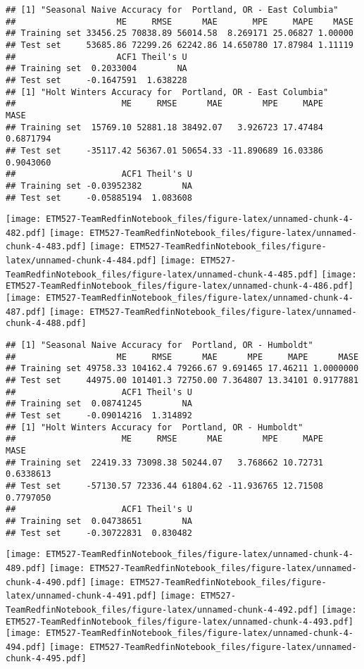 \documentclass[]{article}
\begin{document}
\begin{verbatim}
## [1] "Seasonal Naive Accuracy for  Portland, OR - East Columbia"
##                    ME     RMSE      MAE       MPE     MAPE    MASE
## Training set 33456.25 70838.89 56014.58  8.269171 25.06827 1.00000
## Test set     53685.86 72299.26 62242.86 14.650780 17.87984 1.11119
##                    ACF1 Theil's U
## Training set  0.2033004        NA
## Test set     -0.1647591  1.638228
## [1] "Holt Winters Accuracy for  Portland, OR - East Columbia"
##                     ME     RMSE      MAE        MPE     MAPE      MASE
## Training set  15769.10 52881.18 38492.07   3.926723 17.47484 0.6871794
## Test set     -35117.42 56367.01 50654.33 -11.890689 16.03386 0.9043060
##                     ACF1 Theil's U
## Training set -0.03952382        NA
## Test set     -0.05885194  1.083608
\end{verbatim}

\texttt{[image: ETM527-TeamRedfinNotebook\_files/figure-latex/unnamed-chunk-4-482.pdf]}
\texttt{[image: ETM527-TeamRedfinNotebook\_files/figure-latex/unnamed-chunk-4-483.pdf]}
\texttt{[image: ETM527-TeamRedfinNotebook\_files/figure-latex/unnamed-chunk-4-484.pdf]}
\texttt{[image: ETM527-TeamRedfinNotebook\_files/figure-latex/unnamed-chunk-4-485.pdf]}
\texttt{[image: ETM527-TeamRedfinNotebook\_files/figure-latex/unnamed-chunk-4-486.pdf]}
\texttt{[image: ETM527-TeamRedfinNotebook\_files/figure-latex/unnamed-chunk-4-487.pdf]}
\texttt{[image: ETM527-TeamRedfinNotebook\_files/figure-latex/unnamed-chunk-4-488.pdf]}

\begin{verbatim}
## [1] "Seasonal Naive Accuracy for  Portland, OR - Humboldt"
##                    ME     RMSE      MAE      MPE     MAPE      MASE
## Training set 49758.33 104162.4 79266.67 9.691465 17.46211 1.0000000
## Test set     44975.00 101401.3 72750.00 7.364807 13.34101 0.9177881
##                     ACF1 Theil's U
## Training set  0.08741245        NA
## Test set     -0.09014216  1.314892
## [1] "Holt Winters Accuracy for  Portland, OR - Humboldt"
##                     ME     RMSE      MAE        MPE     MAPE      MASE
## Training set  22419.33 73098.38 50244.07   3.768662 10.72731 0.6338613
## Test set     -57130.57 72336.44 61804.62 -11.936765 12.71508 0.7797050
##                     ACF1 Theil's U
## Training set  0.04738651        NA
## Test set     -0.30722831  0.830482
\end{verbatim}

\texttt{[image: ETM527-TeamRedfinNotebook\_files/figure-latex/unnamed-chunk-4-489.pdf]}
\texttt{[image: ETM527-TeamRedfinNotebook\_files/figure-latex/unnamed-chunk-4-490.pdf]}
\texttt{[image: ETM527-TeamRedfinNotebook\_files/figure-latex/unnamed-chunk-4-491.pdf]}
\texttt{[image: ETM527-TeamRedfinNotebook\_files/figure-latex/unnamed-chunk-4-492.pdf]}
\texttt{[image: ETM527-TeamRedfinNotebook\_files/figure-latex/unnamed-chunk-4-493.pdf]}
\texttt{[image: ETM527-TeamRedfinNotebook\_files/figure-latex/unnamed-chunk-4-494.pdf]}
\texttt{[image: ETM527-TeamRedfinNotebook\_files/figure-latex/unnamed-chunk-4-495.pdf]}
\end{document}
